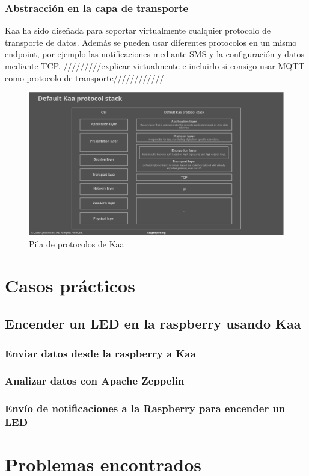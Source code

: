 \documentclass[12pt, twoside]{book}
\begin{document}
\subsubsection*{Abstracción en la capa de transporte}
Kaa ha sido diseñada para soportar virtualmente cualquier protocolo de transporte de datos. Además se pueden usar diferentes protocolos en un mismo endpoint, por ejemplo las notificaciones mediante SMS y la configuración y datos mediante TCP. /////////explicar virtualmente e incluirlo si consigo usar MQTT como protocolo de transporte////////////
\begin{figure}[H]
\centering
\includegraphics[scale=0.4]{images/kaa_stack}
\caption{Pila de protocolos de Kaa}\label{L508}
\end{figure}
\section{Casos prácticos}

\subsection{Encender un LED en la raspberry usando Kaa}
\subsubsection*{Enviar datos desde la raspberry a Kaa}
\subsubsection*{Analizar datos con Apache Zeppelin}
\subsubsection*{Envío de notificaciones a la Raspberry para encender un LED}

\section{Problemas encontrados}
\end{document}
